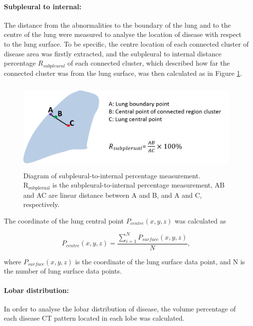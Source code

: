 \paragraph{Subpleural to internal:} The distance from the abnormalities to the boundary of the lung and to the centre of the lung were measured to analyse the location of disease with respect to the lung surface. To be specific, the centre location of each connected cluster of disease area was firstly extracted, and the subpleural to internal distance percentage $R_{subpleural}$ of each connected cluster, which described how far the connected cluster was from the lung surface, was then calculated as in Figure \ref{fig:SubpleuralMethod}.

\begin{figure}[H]
  \centering 
  \includegraphics[height=1.8in]{QuantitativeAnalysis/Image/SubplesrualMethod.png}
  \caption{Diagram of subpleural-to-internal percentage measurement. $\mathrm{R_{subplerual}}$ is the subpleural-to-internal percentage measurement, AB and AC are linear distance between A and B, and A and C, respectively.}
  \label{fig:SubpleuralMethod}
\end{figure}
%

The coordinate of the lung central point $P_{centre}(x,y,z)$ was calculated as

\begin{equation}
P_{centre}(x,y,z) = \frac{\sum\nolimits_{i=1}^N P_{surface}(x,y,z)}{N},
\end{equation}

\noindent where $P_{surface}(x,y,z)$ is the coordinate of the lung surface data point, and N is the number of lung surface data points.

\paragraph{Lobar distribution:} In order to analyse the lobar distribution of disease, the volume percentage of each disease CT pattern located in each lobe was calculated.

